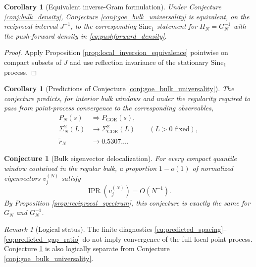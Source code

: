 \documentclass[11pt]{amsart}
\numberwithin{equation}{section}
\theoremstyle{plain}
\newtheorem{corollary}[theorem]{Corollary}
\newtheorem{conjecture}[theorem]{Conjecture}
\theoremstyle{definition}
\theoremstyle{remark}
\newtheorem{remark}[theorem]{Remark}
\newcommand{\IPR}{\operatorname{IPR}}
\newcommand{\GOE}{\mathrm{GOE}}
\begin{document}
\begin{corollary}[Equivalent inverse-Gram formulation]
\label{cor:inverse_goe_equivalence}
Under Conjecture \ref{conj:bulk_density}, Conjecture \ref{conj:goe_bulk_universality} is equivalent, on the reciprocal interval $J^{-1}$, to the corresponding $\mathrm{Sine}_1$ statement for $H_N=G_N^{-1}$ with the push-forward density in \eqref{eq:pushforward_density}.
\end{corollary}

\begin{proof}
Apply Proposition \ref{prop:local_inversion_equivalence} pointwise on compact subsets of $J$ and use reflection invariance of the stationary $\mathrm{Sine}_1$ process.
\end{proof}

\begin{corollary}[Predictions of Conjecture \ref{conj:goe_bulk_universality}]
\label{cor:goe_predictions}
The conjecture predicts, for interior bulk windows and under the regularity required to pass from point-process convergence to the corresponding observables,
\begin{align}
P_N(s)&\Longrightarrow P_{\GOE}(s),
\label{eq:predicted_spacing}\\
\Sigma_N^2(L)&\longrightarrow\Sigma_{\GOE}^2(L)
\qquad(L>0\text{ fixed}),
\label{eq:predicted_number_variance}\\
\overline{\widetilde r}_N&\longrightarrow0.5307\ldots.
\label{eq:predicted_gap_ratio}
\end{align}
\end{corollary}

\begin{conjecture}[Bulk eigenvector delocalization]
\label{conj:bulk_delocalization}
For every compact quantile window contained in the regular bulk, a proportion $1-o(1)$ of normalized eigenvectors $v_j^{(N)}$ satisfy
\begin{equation}
\IPR\!\left(v_j^{(N)}\right)=O(N^{-1}).
\label{eq:ipr_conjecture}
\end{equation}
By Proposition \ref{prop:reciprocal_spectrum}, this conjecture is exactly the same for $G_N$ and $G_N^{-1}$.
\end{conjecture}

\begin{remark}[Logical status]
\label{rem:not_equivalent_diagnostics}
The finite diagnostics \eqref{eq:predicted_spacing}--\eqref{eq:predicted_gap_ratio} do not imply convergence of the full local point process.  Conjecture \ref{conj:bulk_delocalization} is also logically separate from Conjecture \ref{conj:goe_bulk_universality}.
\end{remark}
\end{document}
